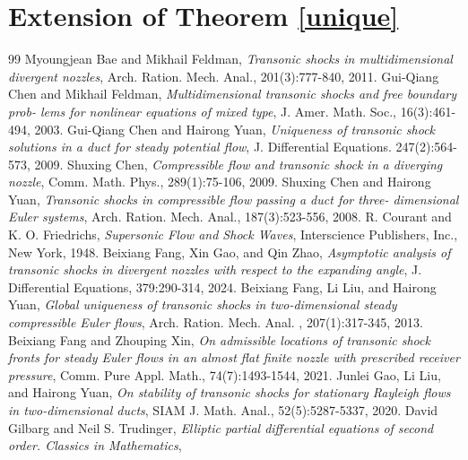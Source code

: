 \documentclass[10pt,a4paper]{amsart}
\numberwithin{equation}{section}
\begin{document}
\section{Extension of  Theorem \ref{unique}}\label{sec3}

\begin{thebibliography}{99}
  Myoungjean Bae and Mikhail Feldman,
\newblock  \emph{Transonic shocks in multidimensional divergent nozzles},
\newblock Arch. Ration. Mech. Anal., 201(3):777-840, 2011.
  Gui-Qiang Chen and Mikhail Feldman,
\newblock  \emph{Multidimensional transonic shocks and free boundary prob- lems for nonlinear equations of mixed type},
\newblock J. Amer. Math. Soc., 16(3):461-494, 2003.
   Gui-Qiang Chen and Hairong Yuan,
\newblock  \emph{Uniqueness of transonic shock solutions in a duct for steady potential flow},
\newblock J. Differential Equations. 247(2):564-573, 2009.
  Shuxing Chen,
\newblock  \emph{Compressible flow and transonic shock in a diverging nozzle},
\newblock Comm. Math. Phys., 289(1):75-106, 2009.
  Shuxing Chen and Hairong Yuan,
\newblock  \emph{Transonic shocks in compressible flow passing a duct for three- dimensional Euler systems},
\newblock Arch. Ration. Mech. Anal., 187(3):523-556, 2008.
  R. Courant and K. O. Friedrichs,
\newblock  \emph{Supersonic Flow  and Shock  Waves},
\newblock Interscience Publishers, Inc., New York, 1948.
   Beixiang Fang, Xin Gao, and Qin Zhao,
\newblock  \emph{Asymptotic analysis of transonic shocks in divergent nozzles with respect to the expanding angle},
\newblock J. Differential Equations, 379:290-314, 2024.
  Beixiang Fang, Li Liu, and Hairong Yuan,
\newblock  \emph{Global uniqueness of transonic shocks in two-dimensional steady compressible Euler flows},
\newblock Arch. Ration. Mech. Anal. , 207(1):317-345, 2013.
  Beixiang Fang and Zhouping Xin,
\newblock  \emph{On admissible locations of transonic shock fronts for steady Euler flows in an almost flat finite nozzle with prescribed receiver pressure},
\newblock Comm. Pure Appl. Math., 74(7):1493-1544, 2021.
  Junlei Gao, Li Liu, and Hairong Yuan,
\newblock  \emph{On stability of transonic shocks for stationary Rayleigh flows in two-dimensional ducts},
\newblock SIAM J. Math. Anal., 52(5):5287-5337, 2020.
  David Gilbarg and Neil S. Trudinger,
\newblock  \emph{Elliptic partial differential equations  of second order. Classics in Mathematics},

\end{thebibliography}
\end{document}

